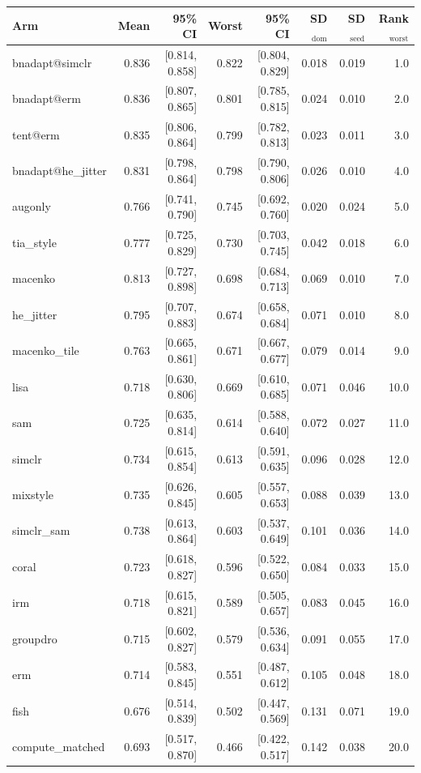 \begin{tabular}{lrrrrrrr}
\toprule
Arm & Mean & 95\% CI & Worst & 95\% CI & SD$_\text{dom}$ & SD$_\text{seed}$ & Rank$_\text{worst}$ \\
\midrule
bnadapt@simclr & 0.836 & [0.814, 0.858] & 0.822 & [0.804, 0.829] & 0.018 & 0.019 & 1.0 \\
bnadapt@erm & 0.836 & [0.807, 0.865] & 0.801 & [0.785, 0.815] & 0.024 & 0.010 & 2.0 \\
tent@erm & 0.835 & [0.806, 0.864] & 0.799 & [0.782, 0.813] & 0.023 & 0.011 & 3.0 \\
bnadapt@he\_jitter & 0.831 & [0.798, 0.864] & 0.798 & [0.790, 0.806] & 0.026 & 0.010 & 4.0 \\
augonly & 0.766 & [0.741, 0.790] & 0.745 & [0.692, 0.760] & 0.020 & 0.024 & 5.0 \\
tia\_style & 0.777 & [0.725, 0.829] & 0.730 & [0.703, 0.745] & 0.042 & 0.018 & 6.0 \\
macenko & 0.813 & [0.727, 0.898] & 0.698 & [0.684, 0.713] & 0.069 & 0.010 & 7.0 \\
he\_jitter & 0.795 & [0.707, 0.883] & 0.674 & [0.658, 0.684] & 0.071 & 0.010 & 8.0 \\
macenko\_tile & 0.763 & [0.665, 0.861] & 0.671 & [0.667, 0.677] & 0.079 & 0.014 & 9.0 \\
lisa & 0.718 & [0.630, 0.806] & 0.669 & [0.610, 0.685] & 0.071 & 0.046 & 10.0 \\
sam & 0.725 & [0.635, 0.814] & 0.614 & [0.588, 0.640] & 0.072 & 0.027 & 11.0 \\
simclr & 0.734 & [0.615, 0.854] & 0.613 & [0.591, 0.635] & 0.096 & 0.028 & 12.0 \\
mixstyle & 0.735 & [0.626, 0.845] & 0.605 & [0.557, 0.653] & 0.088 & 0.039 & 13.0 \\
simclr\_sam & 0.738 & [0.613, 0.864] & 0.603 & [0.537, 0.649] & 0.101 & 0.036 & 14.0 \\
coral & 0.723 & [0.618, 0.827] & 0.596 & [0.522, 0.650] & 0.084 & 0.033 & 15.0 \\
irm & 0.718 & [0.615, 0.821] & 0.589 & [0.505, 0.657] & 0.083 & 0.045 & 16.0 \\
groupdro & 0.715 & [0.602, 0.827] & 0.579 & [0.536, 0.634] & 0.091 & 0.055 & 17.0 \\
erm & 0.714 & [0.583, 0.845] & 0.551 & [0.487, 0.612] & 0.105 & 0.048 & 18.0 \\
fish & 0.676 & [0.514, 0.839] & 0.502 & [0.447, 0.569] & 0.131 & 0.071 & 19.0 \\
compute\_matched & 0.693 & [0.517, 0.870] & 0.466 & [0.422, 0.517] & 0.142 & 0.038 & 20.0 \\
\bottomrule
\end{tabular}
